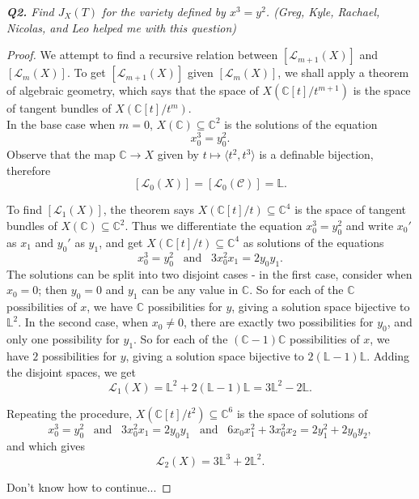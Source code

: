 \documentclass{article}
\begin{document}
\it \textbf{Q2.} Find $J_X(T)$ for the variety defined by $x^3=y^2$. (Greg,
Kyle, Rachael, Nicolas, and Leo helped me with this question)
\begin{proof}
  We attempt to find a recursive relation between $[\mathcal{L}_{m+1}(X)]$
  and $[\mathcal{L}_{m}(X)]$. To get $[\mathcal{L}_{m+1}(X)]$ given
  $[\mathcal{L}_{m}(X)]$, we shall apply a theorem of algebraic geometry,
  which says that the space of $X(\mathbb{C}[t]/t^{m+1})$ is the space of
  tangent bundles of $X(\mathbb{C}[t]/t^{m})$. \\

  In the base case when $m=0$, $X(\mathbb{C}) \subseteq\mathbb{C}^2$
  is the solutions of the equation
  \[x_0^3=y_0^2.\]
  Observe that the map $\mathbb{C}\rightarrow X$ given by $t\mapsto\langle
  t^2,t^3\rangle$ is a definable bijection, therefore
  \[[\mathcal{L}_0(X)] =[\mathcal{L}_0(\mathcal{C})] =\mathbb{L}.\]

  To find $[\mathcal{L}_{1}(X)]$, the theorem says $X(\mathbb{C}[t]/t)
  \subseteq\mathbb{C}^4$ is the space of tangent bundles of
  $X(\mathbb{C})\subseteq\mathbb{C}^2$. Thus we differentiate the
  equation $x_0^3=y_0^2$ and write $x_0'$ as $x_1$ and $y_0'$ as $y_1$, and
  get $X(\mathbb{C}[t]/t) \subseteq\mathbb{C}^4$ as solutions of the
  equations
  \[x_0^3=y_0^2\;\;\; \text{and}\;\;\; 3x_0^2x_1=2y_0y_1.\]
  The solutions can be split into two disjoint cases - in the first case,
  consider when $x_0=0$; then $y_0=0$ and $y_1$ can be any value in
  $\mathbb{C}$. So for each of the $\mathbb{C}$ possibilities of $x$, we
  have $\mathbb{C}$ possibilities for $y$, giving a solution space
  bijective to $\mathbb{L}^2$. In the second case, when $x_0\neq0$, there
  are exactly two possibilities for $y_0$, and only one possibility for
  $y_1$. So for each of the $(\mathbb{C}-1)\mathbb{C}$ possibilities of
  $x$, we have $2$ possibilities for $y$, giving a solution space bijective
  to $2(\mathbb{L}-1)\mathbb{L}$. Adding the disjoint spaces, we get
  \[\mathcal{L}_1(X) =\mathbb{L}^2 +2(\mathbb{L}-1)\mathbb{L}
  =3\mathbb{L}^2-2\mathbb{L}.\]

  Repeating the procedure, $X(\mathbb{C}[t]/t^2) \subseteq\mathbb{C}^6$ is
  the space of solutions of
  \[x_0^3=y_0^2\;\;\; \text{and}\;\;\; 3x_0^2x_1=2y_0y_1\;\;\;
  \text{and}\;\;\; 6x_0x_1^2+3x_0^2x_2=2y_1^2+2y_0y_2,\]
  and which gives 
  \[\mathcal{L}_2(X) =3\mathbb{L}^3 +2\mathbb{L}^2.\]

  Don't know how to continue...
\end{proof}
\end{document}
